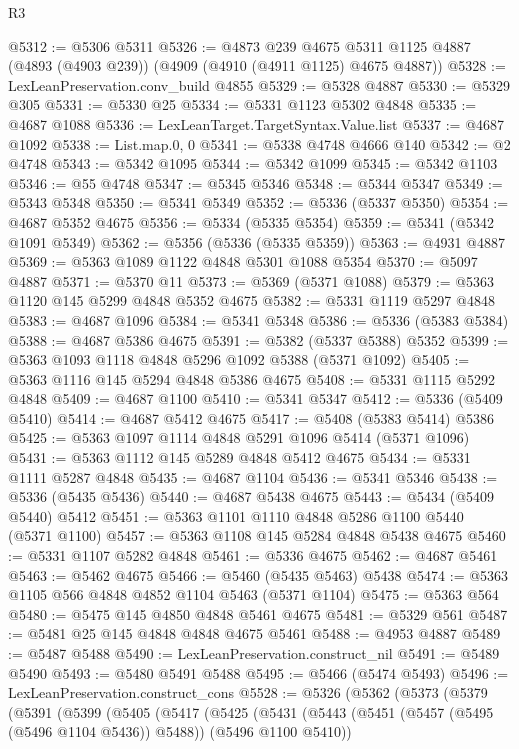\begin{lexlean}{R3}
\begin{coremodule}
@5312 := @5306 @5311
@5326 := @4873
    @239
    @4675
    @5311
    @1125
    @4887
    (@4893 (@4903 @239))
    (@4909 (@4910 (@4911 @1125) @4675 @4887))
@5328 := LexLeanPreservation.conv_build @4855
@5329 := @5328 @4887
@5330 := @5329 @305
@5331 := @5330 @25
@5334 := @5331 @1123 @5302 @4848
@5335 := @4687 @1088
@5336 := LexLeanTarget.TargetSyntax.Value.list
@5337 := @4687 @1092
@5338 := List.map.{0, 0}
@5341 := @5338 @4748 @4666 @140
@5342 := @2 @4748
@5343 := @5342 @1095
@5344 := @5342 @1099
@5345 := @5342 @1103
@5346 := @55 @4748
@5347 := @5345 @5346
@5348 := @5344 @5347
@5349 := @5343 @5348
@5350 := @5341 @5349
@5352 := @5336 (@5337 @5350)
@5354 := @4687 @5352 @4675
@5356 := @5334 (@5335 @5354)
@5359 := @5341 (@5342 @1091 @5349)
@5362 := @5356 (@5336 (@5335 @5359))
@5363 := @4931 @4887
@5369 := @5363 @1089 @1122 @4848 @5301 @1088 @5354
@5370 := @5097 @4887
@5371 := @5370 @11
@5373 := @5369 (@5371 @1088)
@5379 := @5363 @1120 @145 @5299 @4848 @5352 @4675
@5382 := @5331 @1119 @5297 @4848
@5383 := @4687 @1096
@5384 := @5341 @5348
@5386 := @5336 (@5383 @5384)
@5388 := @4687 @5386 @4675
@5391 := @5382 (@5337 @5388) @5352
@5399 := @5363 @1093 @1118 @4848 @5296 @1092 @5388 (@5371 @1092)
@5405 := @5363 @1116 @145 @5294 @4848 @5386 @4675
@5408 := @5331 @1115 @5292 @4848
@5409 := @4687 @1100
@5410 := @5341 @5347
@5412 := @5336 (@5409 @5410)
@5414 := @4687 @5412 @4675
@5417 := @5408 (@5383 @5414) @5386
@5425 := @5363 @1097 @1114 @4848 @5291 @1096 @5414 (@5371 @1096)
@5431 := @5363 @1112 @145 @5289 @4848 @5412 @4675
@5434 := @5331 @1111 @5287 @4848
@5435 := @4687 @1104
@5436 := @5341 @5346
@5438 := @5336 (@5435 @5436)
@5440 := @4687 @5438 @4675
@5443 := @5434 (@5409 @5440) @5412
@5451 := @5363 @1101 @1110 @4848 @5286 @1100 @5440 (@5371 @1100)
@5457 := @5363 @1108 @145 @5284 @4848 @5438 @4675
@5460 := @5331 @1107 @5282 @4848
@5461 := @5336 @4675
@5462 := @4687 @5461
@5463 := @5462 @4675
@5466 := @5460 (@5435 @5463) @5438
@5474 := @5363 @1105 @566 @4848 @4852 @1104 @5463 (@5371 @1104)
@5475 := @5363 @564
@5480 := @5475 @145 @4850 @4848 @5461 @4675
@5481 := @5329 @561
@5487 := @5481 @25 @145 @4848 @4848 @4675 @5461
@5488 := @4953 @4887
@5489 := @5487 @5488
@5490 := LexLeanPreservation.construct_nil
@5491 := @5489 @5490
@5493 := @5480 @5491 @5488
@5495 := @5466 (@5474 @5493)
@5496 := LexLeanPreservation.construct_cons
@5528 := @5326
    (@5362
      (@5373
        (@5379
          (@5391
            (@5399
              (@5405
                (@5417
                  (@5425
                    (@5431
                      (@5443 (@5451 (@5457 (@5495 (@5496 @1104 @5436)) @5488)) (@5496 @1100 @5410))

\end{coremodule}
\end{lexlean}
